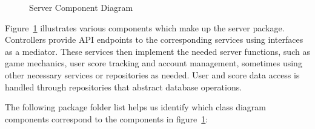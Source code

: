 \documentclass[11pt,a4paper]{article}
\newcommand{\inputdiagram}[1]{}
\newcommand{\textwidthdiagram}[2][1]{%
  \resizebox{#1\textwidth}{!}{\inputdiagram{#2}}%
}
\begin{document}
\begin{figure}[H]
    \centering
    \textwidthdiagram{server_component_diagram.latex}
    \caption{Server Component Diagram}
    \label{fig:server_component_diagram}
\end{figure}

Figure~\ref{fig:server_component_diagram} illustrates various components which make up the server package. Controllers provide API endpoints to the corresponding services using interfaces as a mediator. These services then implement the needed server functions, such as game mechanics, user score tracking and account management, sometimes using other necessary services or repositories as needed. User and score data access is handled through repositories that abstract database operations.


The following package folder list helps us identify which class diagram components correspond to the components in figure~\ref{fig:server_component_diagram}:
\end{document}
